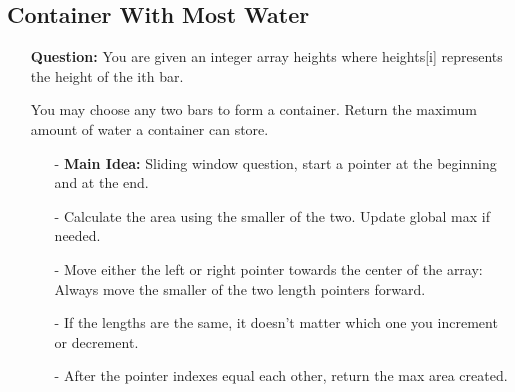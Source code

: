\documentclass[12pt]{article}
\begin{document}
\subsection{Container With Most Water}
\begin{enumerate}
  \item[] \textbf{Question:} You are given an integer array heights where heights[i] represents the height of the ith bar.

You may choose any two bars to form a container. Return the maximum amount of water a container can store.

    \begin{enumerate}
      \item[-] \textbf{Main Idea: } Sliding window question, start a pointer at the beginning and at the end.
      \item[-] Calculate the area using the smaller of the two. Update global max if needed.
      \item[-] Move either the left or right pointer towards the center of the array: Always move the smaller of the two length pointers forward.
      \item[-] If the lengths are the same, it doesn't matter which one you increment or decrement. 
      \item[-] After the pointer indexes equal each other, return the max area created.
    \end{enumerate}
\end{enumerate}
\end{document}
